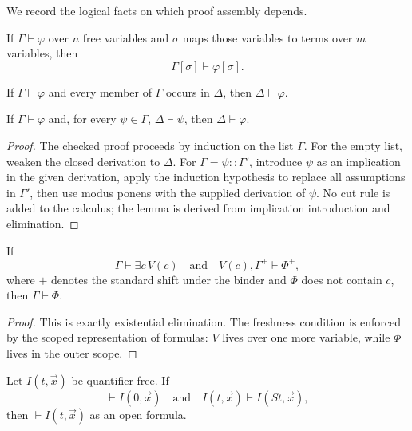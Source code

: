 We record the logical facts on which proof assembly depends.

\begin{lemma}[Substitution]
If \(\Gamma\vdash\varphi\) over \(n\) free variables and
\(\sigma\) maps those variables to terms over \(m\) variables, then
\[
  \Gamma[\sigma]\vdash\varphi[\sigma].
\]
\end{lemma}

\begin{lemma}[Weakening]
If \(\Gamma\vdash\varphi\) and every member of \(\Gamma\) occurs in
\(\Delta\), then \(\Delta\vdash\varphi\).
\end{lemma}

\begin{lemma}
\label{lem:simcut}
If \(\Gamma\vdash\varphi\) and, for every \(\psi\in\Gamma\),
\(\Delta\vdash\psi\), then \(\Delta\vdash\varphi\).
\end{lemma}

\begin{proof}
The checked proof proceeds by induction on the list \(\Gamma\).  For the empty
list, weaken the closed derivation to \(\Delta\).  For
\(\Gamma=\psi::\Gamma'\), introduce \(\psi\) as an implication in the given
derivation, apply the induction hypothesis to replace all assumptions in
\(\Gamma'\), then use modus ponens with the supplied derivation of \(\psi\).
No cut rule is added to the calculus; the lemma is derived from implication
introduction and elimination.
\end{proof}

\begin{lemma}
\label{lem:exseal}
If
\[
  \Gamma\vdash\exists c\,V(c)
  \quad\text{and}\quad
  V(c),\Gamma^+\vdash\Phi^+,
\]
where \(+\) denotes the standard shift under the binder and \(\Phi\) does not
contain \(c\), then \(\Gamma\vdash\Phi\).
\end{lemma}

\begin{proof}
This is exactly existential elimination.  The freshness condition is enforced
by the scoped representation of formulas: \(V\) lives over one more variable,
while \(\Phi\) lives in the outer scope.
\end{proof}

\begin{lemma}
\label{lem:qfind}
Let \(I(t,\vec x)\) be quantifier-free.  If
\[
 \vdash I(0,\vec x)
 \quad\text{and}\quad
 I(t,\vec x)\vdash I(S t,\vec x),
\]
then \(\vdash I(t,\vec x)\) as an open formula.
\end{lemma}

